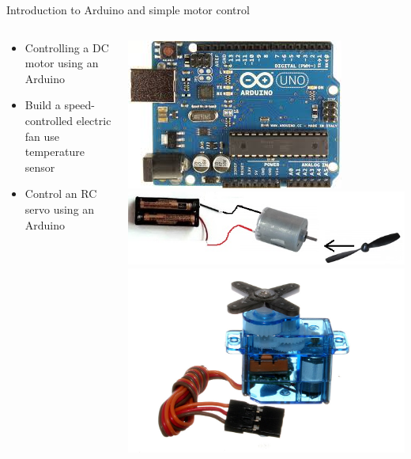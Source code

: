 \documentclass[compress]{beamer}
\begin{document}
\begin{frame}{Introduction to Arduino and simple motor control}
    \begin{columns}
        \begin{column}{0.45\linewidth}

            \begin{itemize}
                \item Controlling a DC motor using an Arduino
                \item Build a speed-controlled electric fan \eg use
                    temperature sensor

                \item Control an RC servo using an Arduino
            \end{itemize}
        \end{column}
        \begin{column}{0.45\linewidth}

            \begin{center}
                \includegraphics[width=0.8\columnwidth]{arduino}\\
                \includegraphics[width=0.8\columnwidth]{dc-motor-fan}\\
                \includegraphics[width=0.8\columnwidth]{servo}\\
            \end{center}


\end{column}
\end{columns}
\end{frame}
\end{document}
